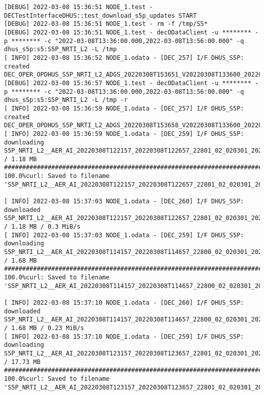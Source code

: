 \documentclass[dec_sum_main.tex]{subfiles}
\begin{document}
\begin{Verbatim}[fontsize=\tiny]
[DEBUG] 2022-03-08 15:36:51 NODE_1.test - DECTestInterfaceDHUS::test_download_s5p_updates START
[DEBUG] 2022-03-08 15:36:51 NODE_1.test - rm -f /tmp/S5*
[DEBUG] 2022-03-08 15:36:51 NODE_1.test - decODataClient -u ******** -p ******** -c "2022-03-08T13:36:00.000,2022-03-08T13:56:00.000" -q dhus_s5p:s5:S5P_NRTI_L2 -L /tmp
[ INFO] 2022-03-08 15:36:52 NODE_1.odata - [DEC_257] I/F DHUS_S5P: created DEC_OPER_OPDHUS_S5P_NRTI_L2_ADGS_20220308T153651_V20220308T133600_20220308T135600_13_00.xml
[DEBUG] 2022-03-08 15:36:57 NODE_1.test - decODataClient -u ******** -p ******** -c "2022-03-08T13:36:00.000,2022-03-08T13:56:00.000" -q dhus_s5p:s5:S5P_NRTI_L2 -L /tmp -r
[ INFO] 2022-03-08 15:36:59 NODE_1.odata - [DEC_257] I/F DHUS_S5P: created DEC_OPER_OPDHUS_S5P_NRTI_L2_ADGS_20220308T153658_V20220308T133600_20220308T135600_13_00.xml
[ INFO] 2022-03-08 15:36:59 NODE_1.odata - [DEC_259] I/F DHUS_S5P: downloading S5P_NRTI_L2__AER_AI_20220308T122157_20220308T122657_22801_02_020301_20220308T132819 / 1.18 MB
################################################################################################################################################################################## 100.0%curl: Saved to filename 'S5P_NRTI_L2__AER_AI_20220308T122157_20220308T122657_22801_02_020301_20220308T132819.nc'

[ INFO] 2022-03-08 15:37:03 NODE_1.odata - [DEC_260] I/F DHUS_S5P: downloaded S5P_NRTI_L2__AER_AI_20220308T122157_20220308T122657_22801_02_020301_20220308T132819 / 1.18 MB / 0.3 MiB/s
[ INFO] 2022-03-08 15:37:03 NODE_1.odata - [DEC_259] I/F DHUS_S5P: downloading S5P_NRTI_L2__AER_AI_20220308T114157_20220308T114657_22800_02_020301_20220308T132516 / 1.68 MB
################################################################################################################################################################################## 100.0%curl: Saved to filename 'S5P_NRTI_L2__AER_AI_20220308T114157_20220308T114657_22800_02_020301_20220308T132516.nc'

[ INFO] 2022-03-08 15:37:10 NODE_1.odata - [DEC_260] I/F DHUS_S5P: downloaded S5P_NRTI_L2__AER_AI_20220308T114157_20220308T114657_22800_02_020301_20220308T132516 / 1.68 MB / 0.23 MiB/s
[ INFO] 2022-03-08 15:37:10 NODE_1.odata - [DEC_259] I/F DHUS_S5P: downloading S5P_NRTI_L2__AER_AI_20220308T123157_20220308T123657_22801_02_020301_20220308T133043 / 17.73 MB
################################################################################################################################################################################## 100.0%curl: Saved to filename 'S5P_NRTI_L2__AER_AI_20220308T123157_20220308T123657_22801_02_020301_20220308T133043.nc'


\end{Verbatim}
\end{document}

